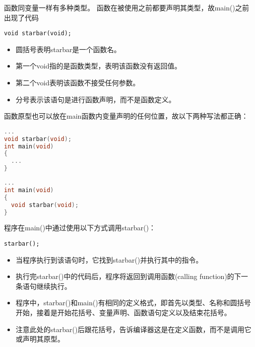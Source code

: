 \begin{frame}[fragile]

函数同变量一样有多种类型。 
函数在被使用之前都要声明其类型，故{\tf main()}之前出现了代码
\begin{lstlisting}[backgroundcolor=\color{red!10}]
void starbar(void);
\end{lstlisting}
\begin{itemize}
\item
圆括号表明{\tf starbar}是一个函数名。\\[0.1in]
\item 
第一个{\tf void}指的是函数类型，表明该函数没有返回值。\\[0.1in]
\item 
第二个{\tf void}表明该函数不接受任何参数。\\[0.1in]
\item 
分号表示该语句是进行函数声明，而不是函数定义。 
\end{itemize}
\end{frame}

\begin{frame}[fragile]
函数原型也可以放在main函数内变量声明的任何位置，故以下两种写法都正确：
\begin{lstlisting}[language=c,backgroundcolor=\color{red!10}]
...
void starbar(void);
int main(void)
{
  ...
}
\end{lstlisting}

\begin{lstlisting}[language=c,backgroundcolor=\color{red!10}]
...
int main(void)
{
  void starbar(void);
}
\end{lstlisting}

\end{frame}

\begin{frame}[fragile]
程序在{\tf main()}中通过使用以下方式调用{\tf starbar()}：
\begin{lstlisting}
starbar();
\end{lstlisting}
\begin{itemize}
\item
当程序执行到该语句时，它找到{\tf starbar()}并执行其中的指令。\\[0.1in]
\item 
执行完{\tf starbar()}中的代码后，程序将返回到调用函数{\tf (calling function)}的下一条语句继续执行。 
\end{itemize}
\end{frame}

\begin{frame}[fragile]
\begin{itemize}
\item
程序中，{\tf starbar()}和{\tf main()}有相同的定义格式，即首先以类型、名称和圆括号开始，接着是开始花括号、变量声明、函数语句定义以及结束花括号。\\[0.1in]
\item 
注意此处的{\tf starbar()}后跟花括号，告诉编译器这是在定义函数，而不是调用它或声明其原型。
\end{itemize}

\end{frame}

